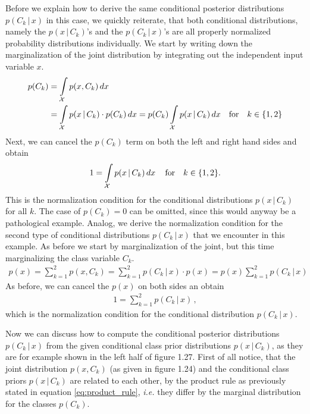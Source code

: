 \documentclass[11pt, DINA4, fleqn]{amsart}
\begin{document}
Before we explain how to derive the same conditional posterior distributions $p(C_k \, | \, x)$ in this case, we quickly reiterate, that both conditional distributions, namely the $p(x \, | \, C_k)$'s and the $p(C_k \, | \, x)$'s are all properly normalized probability distributions individually.
We start by writing down the marginalization of the joint distribution by integrating out the independent input variable $x$.
\begin{align}
p(C_k) &= \int\displaylimits_{\mathcal{X}} p(x, C_k) \, dx \\
&= \int\displaylimits_{\mathcal{X}} p(x \, | \, C_k) \cdot p(C_k) \, dx
= p(C_k) \int\displaylimits_{\mathcal{X}} p(x \, | \, C_k) \, dx \quad \text{for} \quad k\in\{1, 2\}
\end{align}
Next, we can cancel the $p(C_k)$ term on both the left and right hand sides and obtain
\begin{align}
1 = \int\displaylimits_{\mathcal{X}} p(x \, | \, C_k) \, dx \, \quad \text{for} \quad k\in\{1, 2\} .
\end{align}
This is the normalization condition for the conditional distributions $p(x \, | \, C_k)$ for all $k$.
The case of $p(C_k) = 0$ can be omitted, since this would anyway be a pathological example.
Analog, we derive the normalization condition for the second type of conditional distributions $p(C_k \, | \, x)$ that we encounter in this example. As before we start by marginalization of the joint, but this time marginalizing the class variable $C_k$.
\begin{align}
p(x) = \sum_{k = 1}^{2} p(x, C_k) = \sum_{k = 1}^{2} p(C_k \, | \, x) \cdot p(x) = p(x)\sum_{k = 1}^{2} p(C_k \, | \, x)
\end{align}
As before, we can cancel the $p(x)$ on both sides an obtain
\begin{align}
1 = \sum_{k = 1}^{2} p(C_k \, | \, x) \, ,
\end{align}
which is the normalization condition for the conditional distribution $p(C_k \, | \, x)$.

Now we can discuss how to compute the conditional posterior distributions $p(C_k \, | \, x)$ from the given conditional class prior distributions $p(x \, | \, C_k)$, as they are for example shown in the left half of figure 1.27.
First of all notice, that the joint distribution $p(x, C_k)$ (as given in figure 1.24) and the conditional class priors $p(x \, | \, C_k)$ are related to each other, by the product rule as previously stated in equation \eqref{eq:product_rule}, \textit{i.e.} they differ by the marginal distribution for the classes $p(C_k)$.
\end{document}
